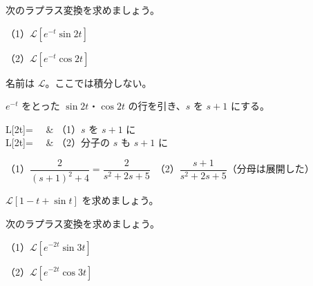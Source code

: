 \begin{reidai}[ゆれながら止まる形]
次のラプラス変換を求めましょう。\par（1）$\mathcal L[e^{-t}\sin2t]$\par（2）$\mathcal L[e^{-t}\cos2t]$\par
\kangaekata {}\par
{}\enspace 名前は $\mathcal L$。ここでは積分しない。\par
{}\enspace $e^{-t}$ をとった $\sin2t$・$\cos2t$ の行を引き、$s$ を $s+1$ にする。\par
\shiki\par\nobreak
\begin{kixghenkei}[0.52]
\mathcal L[\sin2t]=\ \to\  & （1）$s$ を $s+1$ に \\
\mathcal L[\cos2t]=\ \to\  & （2）分子の $s$ も $s+1$ に \\
\end{kixghenkei}
\kotae （1）\nobreak $\dfrac{2}{(s+1)^2+4}=\dfrac{2}{s^2+2s+5}$　（2）\nobreak $\dfrac{s+1}{s^2+2s+5}$（分母は展開した）
\end{reidai}

\begingroup{}%
\noindent\begin{minipage}[t]{0.485\linewidth}\vspace{0pt}
\begin{jibun}
\raggedright $\mathcal L[1-t+\sin t]$ を求めましょう。
\end{jibun}
\end{minipage}\hfill
\begin{minipage}[t]{0.485\linewidth}\vspace{0pt}
\begin{jibun}
\raggedright 次のラプラス変換を求めましょう。\par
（1）\nobreak $\mathcal L[e^{-2t}\sin3t]$\par
（2）\nobreak $\mathcal L[e^{-2t}\cos3t]$
\end{jibun}
\end{minipage}\par
\endgroup


